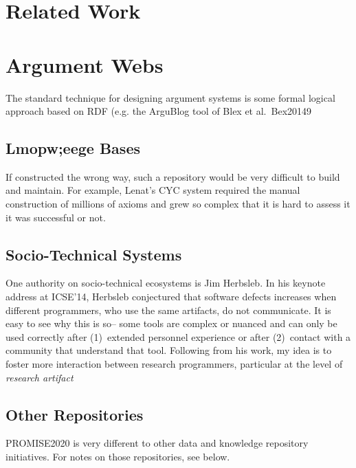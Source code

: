 
\section{Related Work}\label{sect:rw}

\section{Argument Webs}

The standard technique for designing argument systems is some formal logical
approach based on RDF (e.g. the ArguBlog tool of Blex et al.~Bex20149

\subsection{Lmopw;eege Bases}

If constructed the wrong way, such a repository would be very difficult to build and maintain. For example, Lenat's CYC system required the manual construction of millions of axioms and grew so complex that it is hard to assess it it was successful or not\cite{lenta10,lenat91}.



\subsection{Socio-Technical Systems}




One authority on socio-technical ecosystems is Jim Herbsleb.
In his keynote address at  ICSE'14, Herbsleb conjectured  that software defects increases when different  programmers, who use the same artifacts, do not communicate.  It is easy to
see why this is so-- some tools are complex or nuanced and can only be used correctly after (1)~extended personnel experience or after (2)~contact with a community
that understand that tool. Following from his work, my idea is to foster
more interaction between research programmers, particular at the level
of {\em research artifact}

\subsection{Other Repositories}
PROMISE2020 is very different to  other data and knowledge repository initiatives.
For notes on those repositories, see below. 



